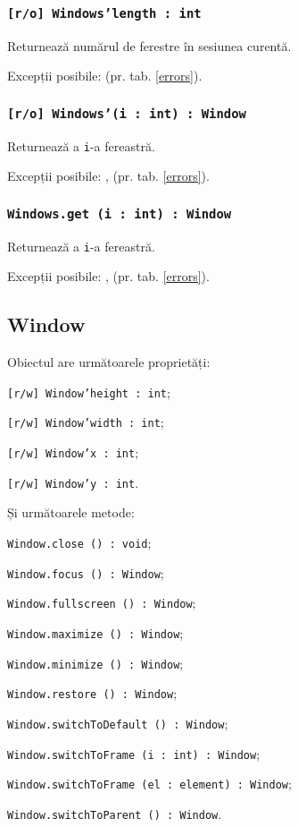 \subsubsection{\texttt{[r/o] Windows'length : int}}

Returnează numărul de ferestre în sesiunea curentă.

Excepții posibile:  (pr. tab. \ref{errors}).

\subsubsection{\texttt{[r/o] Windows'(i : int) : Window}}

Returnează a \texttt{i}-a fereastră.

Excepții posibile: ,  (pr. tab. \ref{errors}).

\subsubsection{\texttt{Windows.get (i : int) : Window}}

Returnează a \texttt{i}-a fereastră.

Excepții posibile: ,  (pr. tab. \ref{errors}).

\subsection{{\color{orange} Window}}

Obiectul \window{} are următoarele proprietăți:
\begin{icItems}
	\item \texttt{[r/w] Window'height : int};
	\item \texttt{[r/w] Window'width : int};
	\item \texttt{[r/w] Window'x : int};
	\item \texttt{[r/w] Window'y : int}.
\end{icItems}

Și următoarele metode:
\begin{icItems}
	\item \texttt{Window.close () : void};
	\item \texttt{Window.focus () : Window};
	\item \texttt{Window.fullscreen () : Window};
	\item \texttt{Window.maximize () : Window};
	\item \texttt{Window.minimize () : Window};
	\item \texttt{Window.restore () : Window};
	\item \texttt{Window.switchToDefault () : Window};
	\item \texttt{Window.switchToFrame (i : int) : Window};
	\item \texttt{Window.switchToFrame (el : element) : Window};
	\item \texttt{Window.switchToParent () : Window}.
\end{icItems}

